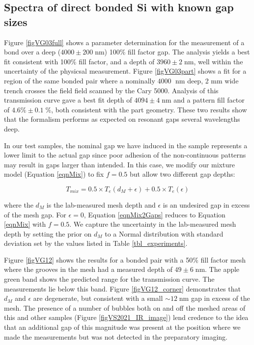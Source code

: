 \documentclass[osajnl,preprint,showpacs,superscriptaddress,12pt]{revtex4-1} %
\begin{document}
\subsection{Spectra of direct bonded Si with known gap sizes}
\label{secKnownGaps}

Figure \ref{figVG03full} shows a parameter determination for the measurement of a bond over a deep ($4000 \pm 200\;$nm) 100\% fill factor gap.  The analysis yields a best fit consistent with 100\% fill factor, and a depth of $3960 \pm 2\;$nm, well within the uncertainty of the physicsal measurement.  Figure \ref{figVG03part} shows a fit for a region of the same bonded pair where a nominally $4000\;$ nm deep, 2 mm wide trench crosses the field field scanned by the Cary 5000.  Analysis of this transmission curve gave a best fit depth of $4094 \pm 4\;$nm and a pattern fill factor of $4.6\% \pm 0.1\;\%$, both consistent with the part geometry.  These two results show that the formalism performs as expected on resonant gaps several wavelengths deep.  

In our test samples, the nominal gap we have induced in the sample represents a lower limit to the actual gap since poor adhesion of the non-continuous patterns may result in gaps larger than intended.  In this case, we modify our mixture model (Equation \ref{eqnMix}) to fix $f=0.5$ but allow two different gap depths:

\begin{equation}
	T_{mix} =  0.5 \times T_{e}(d_M + \epsilon) + 0.5 \times T_{e}(\epsilon) \label{eqnMix2Gaps}
\end{equation}

where the $d_M$ is the lab-measured mesh depth and $\epsilon$ is an undesired gap in excess of the mesh gap.  For $\epsilon =0$, Equation \ref{eqnMix2Gaps} reduces to Equation \ref{eqnMix} with $f=0.5$.  We capture the uncertainty in the lab-measured mesh depth by setting the prior on $d_M$ to a Normal distribution with standard deviation set by the values listed in Table \ref{tbl_experiments}.  

Figure \ref{figVG12} shows the results for a bonded pair with a 50\% fill factor mesh where the grooves in the mesh had a measured depth of $49\pm6\;$nm.  The apple green band shows the predicted range for the transmission curve.  The measurements lie below this band.  Figure \ref{figVG12_corner} demonstrates that $d_M$ and $\epsilon$ are degenerate, but consistent with a small $\sim 12\;$nm gap in excess of the mesh.  The presence of a number of bubbles both on and off the meshed areas of this and other samples (Figure \ref{figVS2021_IR_image}) lend credence to the idea that an additional gap of this magnitude was present at the position where we made the measurements but was not detected in the preparatory imaging.
\end{document}

